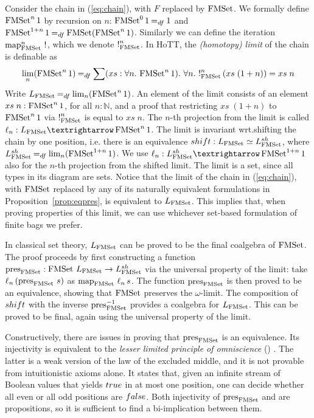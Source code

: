\documentclass[a4paper,USenglish,cleveref]{lipics-v2021}
\begin{document}
Consider the chain in (\ref{eq:chain}), with $F$ replaced by $\FMSet$. We formally define $\FMSet^n 1$ by recursion on $n$: $\FMSet^0 1 \DefEq 1$ and $\FMSet^{1 + n} 1 \DefEq \FMSet (\FMSet^n 1)$. Similarly we can define the iteration $\Map{\FMSet}^n\,\Bang$, which we denote $\Bang^n_{\FMSet}$.
In HoTT, the \emph{(homotopy) limit} of the chain is definable as
\[
\lim_{n} (\FMSet^n 1) \DefEq \sum (xs : \forall n \Where \FMSet^n 1) \Where \forall n \Where
  \Bang^n_{\FMSet}\,(xs\;(1 + n)) = xs\;n
\]
Write $\Lim{\FMSet} \DefEq \lim_{n} (\FMSet^n 1)$. An element of the limit consists of an element $xs\;n : \FMSet^n 1$, for all $n : ℕ$, and a proof that restricting $xs\;(1 + n)$ to $\FMSet^n 1$ via $\Bang^n_{\FMSet}$ is equal to $xs\;n$. The $n$-th projection from the limit is called $\ell_n : \Lim{\FMSet} → \FMSet^n 1$. The limit is invariant wrt.\@ shifting the chain by one position, i.e. there is an equivalence $\shift : \Lim{\FMSet} \simeq \LimSh{\FMSet}$, where $\LimSh{\FMSet} \DefEq \lim_{n} (\FMSet^{1 + n} 1)$. We use $\ell_n : \LimSh{\FMSet} → \FMSet^{1+n} 1$ also for the $n$-th projection from the shifted limit.
The limit is a set, since all types in its diagram are sets.
Notice that the limit of the chain in (\ref{eq:chain}), with $\FMSet$ replaced by any of its naturally equivalent formulations in Proposition~\ref{prop:eqpres}, is equivalent to $\Lim{\FMSet}$. This implies that, when proving properties of this limit, we can use whichever set-based formulation of finite bags we prefer.

In classical set theory, $\Lim{\FMSet}$ can be proved to be the final coalgebra of $\FMSet$. The proof proceeds by first constructing a function $\pres{\FMSet} : \FMSet \,\Lim{\FMSet} \to \LimSh{\FMSet}$ via the universal property of the limit: take $\ell_n\,(\pres{\FMSet} \,s)$ as $\Map{\FMSet}\,\ell_n \,s$. The function $\pres{\FMSet}$ is then proved to be an equivalence, showing that $\FMSet$ preserves the $\omega$-limit. The composition of $\shift$ with the inverse $\pres{\FMSet}^{-1}$ provides a coalgebra for $\Lim{\FMSet}$. This can be proved to be final, again using the universal property of the limit.

Constructively, there are issues in proving that $\pres{\FMSet}$ is an equivalence. Its injectivity is equivalent to the \emph{lesser limited principle of omniscience} (\LLPO{}) \cite[{Ch.\@ 1}]{Bridges1987}. The latter is a weak version of the law of the excluded middle, and it is not provable from intuitionistic axioms alone.  It states that, given an infinite stream of Boolean
values that yields $\True$ in at most one position, one can decide
whether all even or all odd positions are $\False$.
Both injectivity of $\pres{\FMSet}$ and \LLPO{} are propositions, so it is sufficient to find a bi-implication between them. %
\end{document}

